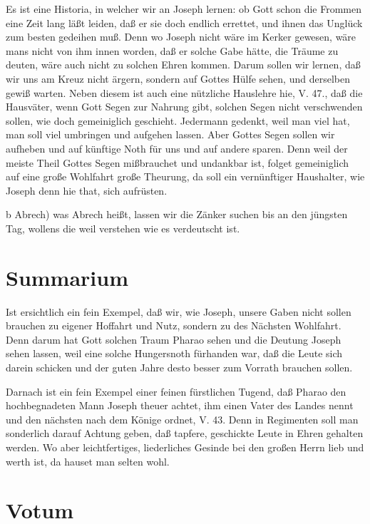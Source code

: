 Es ist eine Historia, in welcher wir an Joseph lernen: ob Gott schon die Frommen eine Zeit lang läßt leiden, daß er sie doch endlich errettet, und ihnen das Unglück zum besten gedeihen muß. Denn wo Joseph nicht wäre im Kerker gewesen, wäre mans nicht von ihm innen worden, daß er solche Gabe hätte, die Träume zu deuten, wäre auch nicht zu solchen Ehren kommen. Darum sollen wir lernen, daß wir uns am Kreuz nicht ärgern, sondern auf Gottes Hülfe sehen, und derselben gewiß warten. Neben diesem ist auch eine nützliche Hauslehre hie, V. 47., daß die Hausväter, wenn Gott Segen zur Nahrung gibt, solchen Segen nicht verschwenden sollen, wie doch gemeiniglich geschieht. Jedermann gedenkt, weil man viel hat, man soll viel umbringen und aufgehen lassen. Aber Gottes Segen sollen wir aufheben und auf künftige Noth für uns und auf andere sparen. Denn weil der meiste Theil Gottes Segen mißbrauchet und undankbar ist, folget gemeiniglich auf eine große Wohlfahrt große Theurung, da soll ein vernünftiger Haushalter, wie Joseph denn hie that, sich aufrüsten.

b Abrech) was Abrech heißt, lassen wir die Zänker suchen bis an den jüngsten Tag, wollens die weil verstehen wie es verdeutscht ist.

\section{Summarium}

Ist ersichtlich ein fein Exempel, daß wir, wie Joseph, unsere Gaben nicht sollen brauchen zu eigener Hoffahrt und Nutz, sondern zu des Nächsten Wohlfahrt. Denn darum hat Gott solchen Traum Pharao sehen und die Deutung Joseph sehen lassen, weil eine solche Hungersnoth fürhanden war, daß die Leute sich darein schicken und der guten Jahre desto besser zum Vorrath brauchen sollen.

Darnach ist ein fein Exempel einer feinen fürstlichen Tugend, daß Pharao den hochbegnadeten Mann Joseph theuer achtet, ihm einen Vater des Landes nennt und den nächsten nach dem Könige ordnet, V. 43. Denn in Regimenten soll man sonderlich darauf Achtung geben, daß tapfere, geschickte Leute in Ehren gehalten werden. Wo aber leichtfertiges, liederliches Gesinde bei den großen Herrn lieb und werth ist, da hauset man selten wohl.

\section{Votum}


